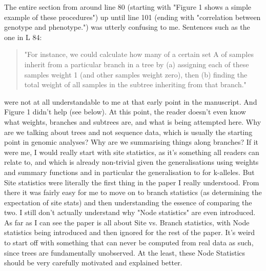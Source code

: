 \begin{point}{}
The entire section from around line 80 (starting with "Figure 1 shows a simple example of these procedures") up until line 101 (ending with "correlation between genotype and phenotype.") was utterly confusing to me. Sentences such as the one in L 84:
    \begin{quote}
"For instance, we could calculate how many of a certain set A of samples inherit from a particular branch in a tree by (a) assigning each of these samples weight 1 (and other samples weight zero), then (b) finding the total weight of all samples in the subtree inheriting from that branch."
    \end{quote}
were not at all understandable to me at that early point in the manuscript. And Figure 1 didn't help (see below). At this point, the reader doesn't even know what weights, branches and subtrees are, and what is being attempted here. Why are we talking about trees and not sequence data, which is usually the starting point in genomic analyses? Why are we summarising things along branches? If it were me, I would really start with site statistics, as it's something all readers can relate to, and which is already non-trivial given the generalisations using weights and summary functions and in particular the generalisation to for k-alleles. But Site statistics were literally the first thing in the paper I really understood. From there it was fairly easy for me to move on to branch statistics (as determining the expectation of site stats) and then understanding the essence of comparing the two. I still don't actually understand why "Node statistics" are even introduced. As far as I can see the paper is all about Site vs. Branch statistics, with Node statistics being introduced and then ignored for the rest of the paper. It's weird to start off with something that can never be computed from real data as such, since trees are fundamentally unobserved. At the least, these Node Statistics should be very carefully motivated and explained better.
\end{point}

\reply{
}

